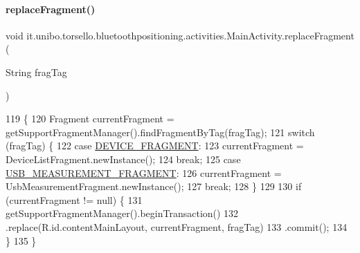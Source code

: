\hypertarget{classit_1_1unibo_1_1torsello_1_1bluetoothpositioning_1_1activities_1_1MainActivity_a98db4478d28cd91118138d0b652ceb2c_a98db4478d28cd91118138d0b652ceb2c}{}\label{classit_1_1unibo_1_1torsello_1_1bluetoothpositioning_1_1activities_1_1MainActivity_a98db4478d28cd91118138d0b652ceb2c_a98db4478d28cd91118138d0b652ceb2c} 
\paragraph{\texorpdfstring{replace\+Fragment()}{replaceFragment()}}
{\footnotesize\ttfamily void it.\+unibo.\+torsello.\+bluetoothpositioning.\+activities.\+Main\+Activity.\+replace\+Fragment (\begin{DoxyParamCaption}\item[{String}]{frag\+Tag }\end{DoxyParamCaption})}


\begin{DoxyCode}
119                                                 \{
120         Fragment currentFragment = getSupportFragmentManager().findFragmentByTag(fragTag);
121         \textcolor{keywordflow}{switch} (fragTag) \{
122             \textcolor{keywordflow}{case} \hyperlink{classit_1_1unibo_1_1torsello_1_1bluetoothpositioning_1_1activities_1_1MainActivity_a2f77c0245ac2525dc58905e38e1817d1_a2f77c0245ac2525dc58905e38e1817d1}{DEVICE\_FRAGMENT}:
123                 currentFragment = DeviceListFragment.newInstance();
124                 \textcolor{keywordflow}{break};
125             \textcolor{keywordflow}{case} \hyperlink{classit_1_1unibo_1_1torsello_1_1bluetoothpositioning_1_1activities_1_1MainActivity_a64bac06e6db556ba1e36c8773e61137b_a64bac06e6db556ba1e36c8773e61137b}{USB\_MEASUREMENT\_FRAGMENT}:
126                 currentFragment = UsbMeasurementFragment.newInstance();
127                 \textcolor{keywordflow}{break};
128         \}
129 
130         \textcolor{keywordflow}{if} (currentFragment != null) \{
131             getSupportFragmentManager().beginTransaction()
132                     .replace(R.id.contentMainLayout, currentFragment, fragTag)
133                     .commit();
134         \}
135     \}
\end{DoxyCode}


